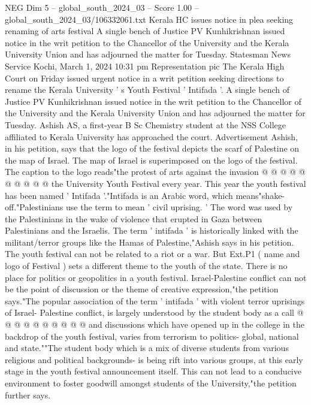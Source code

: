 \begin{textsample}{NEG Dim 5 – global\_south\_2024\_03 – Score 1.00 – global\_south\_2024\_03/106332061.txt}  \label{ex:f5_neg_313}
Kerala HC issues notice in plea seeking renaming of arts festival A single bench of Justice PV Kunhikrishnan issued notice in the writ petition to the Chancellor of the University and the Kerala University Union and has adjourned the matter for Tuesday.
Statesman News Service Kochi, March 1, 2024 10:31 pm Representation pic The Kerala High Court on Friday issued urgent notice in a writ petition seeking directions to rename the Kerala University ' s Youth Festival ' Intifada '.
A single bench of Justice PV Kunhikrishnan issued notice in the writ petition to the Chancellor of the University and the Kerala University Union and has adjourned the matter for Tuesday.
Ashish AS, a first-year B Sc Chemistry student at the NSS College affiliated to Kerala University has approached the court.
Advertisement Ashish, in his petition, says that the logo of the festival depicts the scarf of Palestine on the map of Israel.
The map of Israel is superimposed on the logo of the festival.
The caption to the logo reads"the protest of arts against the invasion @ @ @ @ @ @ @ @ @ @ the University Youth Festival every year.
This year the youth festival has been named ' Intifada '."Intifada is an Arabic word, which means"shake-off."Palestinians use the term to mean ' civil uprising. ' The word was used by the Palestinians in the wake of violence that erupted in Gaza between Palestinians and the Israelis.
The term ' intifada ' is historically linked with the militant/terror groups like the Hamas of Palestine,"Ashish says in his petition.
The youth festival can not be related to a riot or a war.
But Ext.P1 ( name and logo of Festival ) sets a different theme to the youth of the state.
There is no place for politics or geopolitics in a youth festival.
Israel-Palestine conflict can not be the point of discussion or the theme of creative expression,"the petition says."The popular association of the term ' intifada ' with violent terror uprisings of Israel- Palestine conflict, is largely understood by the student body as a call @ @ @ @ @ @ @ @ @ @ and discussions which have opened up in the college in the backdrop of the youth festival, varies from terrorism to politics- global, national and state.""The student body which is a mix of diverse students from various religious and political backgrounds- is being rift into various groups, at this early stage in the youth festival announcement itself.
This can not lead to a conducive environment to foster goodwill amongst students of the University,"the petition further says.

\end{textsample}
